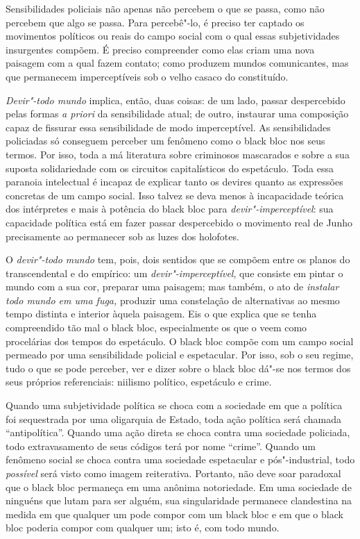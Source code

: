 Sensibilidades policiais não apenas não percebem o que se passa, como
não percebem que algo se passa. Para percebê"-lo, é preciso ter captado
os movimentos políticos ou reais do campo social com o qual essas
subjetividades insurgentes compõem. É preciso compreender como elas
criam uma nova paisagem com a qual fazem contato; como produzem mundos
comunicantes, mas que permanecem imperceptíveis sob o velho casaco do
constituído.

\emph{Devir"-todo mundo} implica, então, duas coisas: de um lado, passar
despercebido pelas formas \emph{a priori }da sensibilidade atual; de
outro, instaurar uma composição capaz de fissurar essa sensibilidade de
modo imperceptível. As sensibilidades policiadas só conseguem perceber
um fenômeno como o black bloc nos seus termos. Por isso, toda a
má literatura sobre criminosos mascarados e sobre a sua suposta
solidariedade com os circuitos capitalísticos do espetáculo. Toda essa
paranoia intelectual é incapaz de explicar tanto os devires quanto as
expressões concretas de um campo social. Isso talvez se deva menos à
incapacidade teórica dos intérpretes e mais à potência do black
bloc para \emph{devir"-imperceptível}: sua capacidade política está em
fazer passar despercebido o movimento real de Junho precisamente ao
permanecer sob as luzes dos holofotes.

O \emph{devir"-todo mundo} tem, pois, dois sentidos que se compõem entre
os planos do transcendental e do empírico: um
\emph{devir"-imperceptível}, que consiste em pintar o mundo com a sua
cor, preparar uma paisagem; mas também, o ato de \emph{instalar todo
mundo em uma fuga, }produzir uma constelação de alternativas ao mesmo
tempo distinta e interior àquela paisagem. Eis o que explica que se
tenha compreendido tão mal o black bloc, especialmente os que o
veem como procelárias dos tempos do espetáculo. O black bloc
compõe com um campo social permeado por uma sensibilidade policial e
espetacular. Por isso, sob o seu regime, tudo o que se pode perceber,
ver e dizer sobre o black bloc dá"-se nos termos dos seus próprios
referenciais: niilismo político, espetáculo e crime.

Quando uma subjetividade política se choca com a sociedade em que a
política foi sequestrada por uma oligarquia de Estado, toda ação
política será chamada ``antipolítica''. Quando uma ação direta se choca
contra uma sociedade policiada, todo extravasamento de seus códigos terá
por nome ``crime''. Quando um fenômeno social se choca contra uma
sociedade espetacular e pós"-industrial, todo\emph{ possível }será visto
como imagem reiterativa. Portanto, não deve soar paradoxal que o
black bloc permaneça em uma anônima notoriedade. Em uma sociedade
de ninguéns que lutam para ser alguém, sua singularidade permanece
clandestina na medida em que qualquer um pode compor com um black
bloc e em que o black bloc poderia compor com qualquer um;
isto é, com todo mundo.

